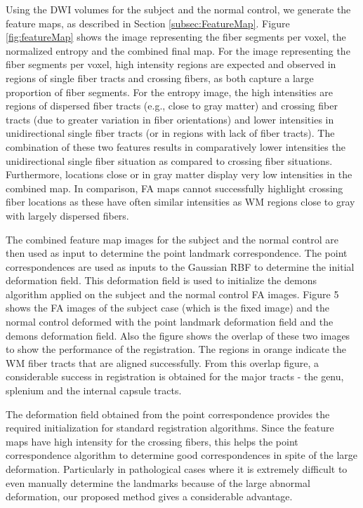 \documentclass{llncs}
\begin{document}
Using the DWI volumes for the subject and the normal control, we generate the feature maps, as described in Section \ref{subsec:FeatureMap}. Figure \ref{fig:featureMap} shows the image representing the fiber segments per voxel, the normalized entropy and the combined final map. For the image representing the fiber segments per voxel,  high intensity regions are expected and observed in regions of single fiber tracts and crossing fibers, as both capture a large proportion of fiber segments. For the entropy image, the high intensities are regions of dispersed fiber tracts (e.g., close to gray matter) and crossing fiber tracts (due to greater variation in fiber orientations) and lower intensities in unidirectional single fiber tracts (or in regions with lack of fiber tracts). The combination of  these two features results in comparatively lower intensities the unidirectional single fiber situation as compared to crossing fiber situations. Furthermore, locations close or in gray matter display very low intensities in the combined map.  In comparison, FA maps cannot successfully highlight crossing fiber locations as these have often similar intensities as WM regions close to gray with largely dispersed fibers.

The combined feature map images for the subject and the normal control are then used as input to determine the point landmark correspondence. The point correspondences are used as inputs to the Gaussian RBF to determine the initial deformation field. This deformation field is used to initialize the demons algorithm applied on the subject and the normal control FA images. Figure 5 shows the FA images of the subject case (which is the fixed image) and the normal control deformed with the point landmark deformation field and the demons deformation field. Also the figure shows the overlap of these two images to show the performance of the registration. The regions in orange indicate the WM fiber tracts that are aligned successfully. From this overlap figure, a considerable success in registration is obtained for the major tracts - the genu, splenium and the internal capsule tracts.

The deformation field obtained from the point correspondence provides the required initialization for standard registration algorithms. Since the feature maps have high intensity for the crossing fibers, this helps the point correspondence algorithm to determine good correspondences in spite of the large deformation. Particularly in pathological cases where it is extremely difficult to even manually determine the landmarks because of the large abnormal deformation, our proposed method gives a considerable advantage.
\end{document}
